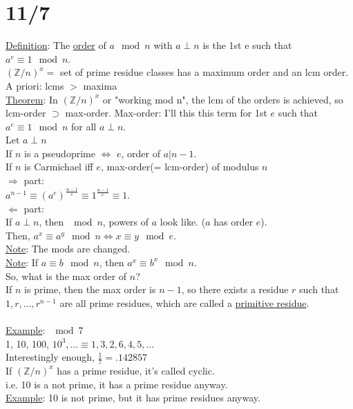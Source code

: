 \documentclass[13pt]{article}
\begin{document}
\section*{11/7}
	\underline{Definition}: The \underline{order} of $a \mod n$ with $a \perp
	n$ is the 1st e such that $a^e \equiv 1 \mod n$.\\
	$(\mathbb{Z}/n)^x = $ set of prime residue classes has a maximum order
	and an lcm order.\\
	A priori: lcms $>$ maxima\\
	\underline{Theorem}:  In $(\mathbb{Z}/n)^x$ or "working mod n", the
	lcm of the orders is achieved, so lcm-order $\supset$ max-order.
	Max-order: I'll this this term for 1st $e$ such that $a^e \equiv 1 \mod n$
	for all $a \perp n$.\\
	Let $a \perp n$\\
	If $n$ is a pseudoprime $\Leftrightarrow$ $e$, order of $a | n - 1$.\\
	If $n$ is Carmichael iff $e$, max-order(= lcm-order) of modulus $n$\\
	$\Rightarrow$ part:\\
	$a^{n -1} \equiv (a^e)^{\frac{n-1}{e}} \equiv 1^{\frac{n-1}{e}} \equiv 
	1$. \\
	$\Leftarrow$ part:\\
	If $a \perp n$, then $\mod n$, powers of $a$ look like. ($a$ has order 
	$e$). \\
	Then, $a^x \equiv a^y \mod n \Leftrightarrow x \equiv y \mod e$.\\
	\underline{Note}: The mods are changed.\\
	\underline{Note}: If $a \equiv b \mod n$, then $a^x \equiv b^x \mod n$.\\
	So, what is the max order of $n$?\\
	If $n$ is prime, then the max order is $n-1$, so there exists a residue
	$r$ such that $1, r, \ldots, r^{n-1}$ are all prime residues, which
	are called a \underline{primitive residue}.\\\\
	\underline{Example}: $\mod 7$\\
	1, 10, 100, $10^3, \ldots \equiv 1, 3, 2, 6, 4, 5, \ldots$\\
	Interestingly enough, $\frac{1}{7} = .142857$\\
	If $(\mathbb{Z}/n)^x$ has a prime residue, it's called cyclic.\\
	i.e. 10 is a not prime, it has a prime residue anyway.\\
	\underline{Example}: 10 is not prime, but it has prime residues anyway.
\end{document}
